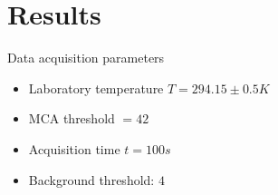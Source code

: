 \documentclass[a4paper]{article}
\begin{document}
\newpage
\section{Results}
Data acquisition parameters
\begin{itemize}
    \item Laboratory temperature $T = 294.15 \pm 0.5 K$
    \item MCA threshold $ = 42$
    \item Acquisition time $t = 100s$
    \item Background threshold: $4$
\end{itemize}

\begin{figure}[!htb]
\end{figure}
\end{document}
